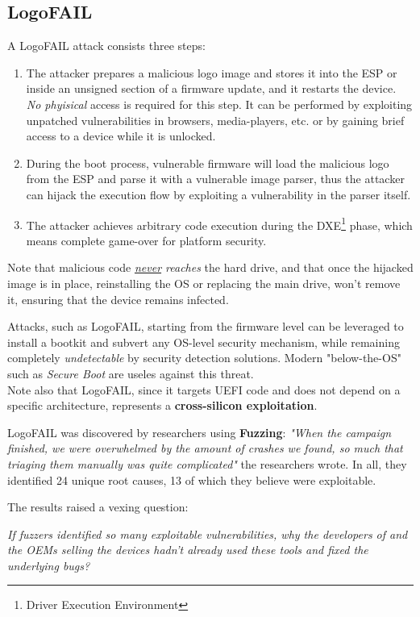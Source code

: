 \subsection{LogoFAIL}
A LogoFAIL attack consists three steps:
\begin{enumerate}
   \item The attacker prepares a malicious logo image and stores it into the ESP or inside an unsigned section of a firmware update, and it restarts the device.\\
   \textit{No phyisical} access is required for this step.
   It can be performed by exploiting unpatched vulnerabilities in browsers, media-players, etc. or by gaining brief access to a device while it is unlocked.   
   \item During the boot process, vulnerable firmware will load the malicious logo from the ESP and parse it with a vulnerable image parser,
   thus the attacker can hijack the execution
   flow by exploiting a vulnerability in the parser itself.
   \item The attacker achieves arbitrary code execution during the DXE\footnote{Driver Execution Environment} phase, which means complete game-over for platform security.
\end{enumerate}

Note that malicious code \textit{\underline{never} reaches} the hard drive,
and that once the hijacked image is in place, reinstalling the OS or replacing the main drive, won't remove it,
ensuring that the device remains infected.

Attacks, such as LogoFAIL, starting from the firmware level can be leveraged to install
a bootkit and subvert any OS-level security mechanism, while
remaining completely \textit{undetectable} by security detection solutions.
Modern "below-the-OS" such as \textit{Secure Boot} are useles against this threat.\\
Note also that LogoFAIL, since it targets UEFI code and does not depend on a specific architecture, represents a \textbf{cross-silicon exploitation}.

\nl
LogoFAIL was discovered by researchers using \textbf{Fuzzing}:
\textit{"When the campaign finished, we were overwhelmed by the amount of crashes we
found, so much that triaging them manually was quite complicated"}
the researchers wrote. 
In all, they identified 24 unique root causes, 13 of which they believe were exploitable.

The results raised a vexing question:
\begin{center}
   \textit{If fuzzers identified so many exploitable vulnerabilities, why the developers of
   and the OEMs selling the devices hadn’t already used these tools and fixed
   the underlying bugs?}
\end{center}


